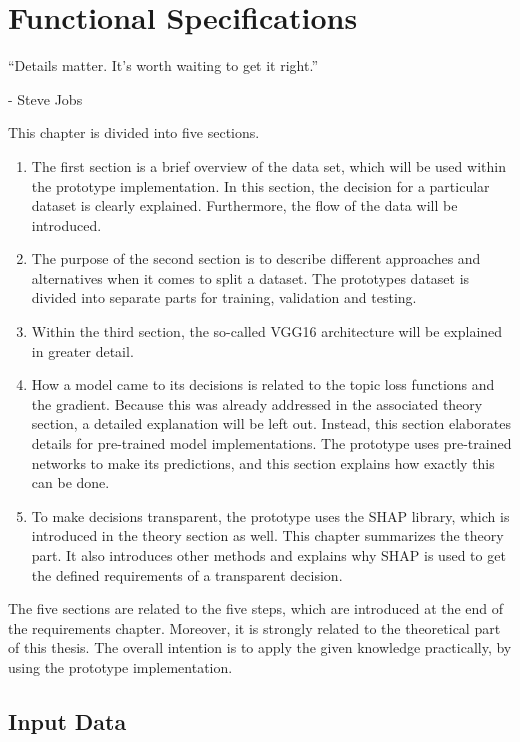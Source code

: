 
\chapter{Functional Specifications}
\label{ch:functional_specifications}
\epigraph{“Details matter. It’s worth waiting to get it right.”}{- Steve Jobs}

This chapter is divided into five sections. 
\begin{enumerate}
	\item The first section is a brief overview of the data set, which will be used within the prototype implementation. In this section, the decision for a particular dataset is clearly explained. Furthermore, the flow of the data will be introduced. 
	\item The purpose of the second section is to describe different approaches and alternatives when it comes to split a dataset. The prototypes dataset is divided into separate parts for training, validation and testing.
	\item Within the third section, the so-called VGG16 architecture will be explained in greater detail. 
	\item How a model came to its decisions is related to the topic loss functions and the gradient. Because this was already addressed in the associated theory section, a detailed explanation will be left out. Instead, this section elaborates details for pre-trained model implementations. The prototype uses pre-trained networks to make its predictions, and this section explains how exactly this can be done. 
	\item To make decisions transparent, the prototype uses the SHAP library, which is introduced in the theory section as well. This chapter summarizes the theory part. It also introduces other methods and explains why SHAP is used to get the defined requirements of a transparent decision. 
\end{enumerate}

The five sections are related to the five steps, which are introduced at the end of the requirements chapter. Moreover, it is strongly related to the theoretical part of this thesis. The overall intention is to apply the given knowledge practically, by using the prototype implementation.

\section{Input Data}
\label{sec:input_data}


